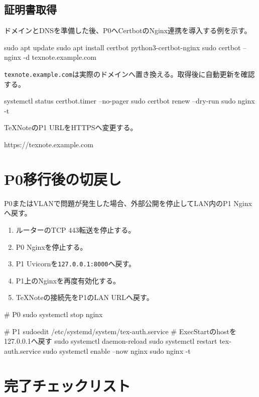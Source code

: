 \documentclass[uplatex,a4paper,11pt]{jsarticle}
\begin{document}
\subsection{証明書取得}

ドメインとDNSを準備した後、P0へCertbotのNginx連携を導入する例を示す。

\begin{command}
sudo apt update
sudo apt install certbot python3-certbot-nginx
sudo certbot --nginx -d texnote.example.com
\end{command}

\texttt{texnote.example.com}は実際のドメインへ置き換える。取得後に自動更新を確認する。

\begin{command}
systemctl status certbot.timer --no-pager
sudo certbot renew --dry-run
sudo nginx -t
\end{command}

TeXNoteのP1 URLをHTTPSへ変更する。

\begin{command}
https://texnote.example.com
\end{command}

\section{P0移行後の切戻し}

P0またはVLANで問題が発生した場合、外部公開を停止してLAN内のP1 Nginxへ戻す。

\begin{enumerate}
  \item ルーターのTCP 443転送を停止する。
  \item P0 Nginxを停止する。
  \item P1 Uvicornを\texttt{127.0.0.1:8000}へ戻す。
  \item P1上のNginxを再度有効化する。
  \item TeXNoteの接続先をP1のLAN URLへ戻す。
\end{enumerate}

\begin{command}
# P0
sudo systemctl stop nginx

# P1
sudoedit /etc/systemd/system/tex-auth.service
# ExecStartのhostを127.0.0.1へ戻す
sudo systemctl daemon-reload
sudo systemctl restart tex-auth.service
sudo systemctl enable --now nginx
sudo nginx -t
\end{command}

\section{完了チェックリスト}
\end{document}
